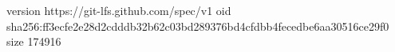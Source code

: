 version https://git-lfs.github.com/spec/v1
oid sha256:ff3ecfe2e28d2cdddb32b62c03bd289376bd4cfdbb4fecedbe6aa30516ce29f0
size 174916
